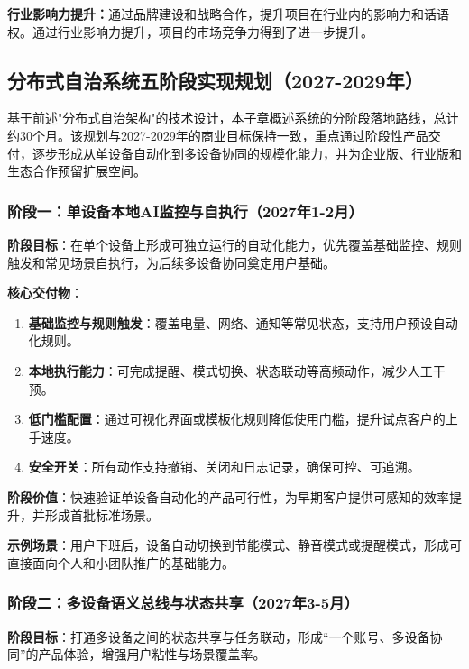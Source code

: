 \documentclass[12pt,a4paper]{article}
\begin{document}
\textbf{行业影响力提升：}通过品牌建设和战略合作，提升项目在行业内的影响力和话语权。通过行业影响力提升，项目的市场竞争力得到了进一步提升。

\subsection{分布式自治系统五阶段实现规划（2027-2029年）}

基于前述"分布式自治架构"的技术设计，本子章概述系统的分阶段落地路线，总计约30个月。该规划与2027-2029年的商业目标保持一致，重点通过阶段性产品交付，逐步形成从单设备自动化到多设备协同的规模化能力，并为企业版、行业版和生态合作预留扩展空间。

\subsubsection{阶段一：单设备本地AI监控与自执行（2027年1-2月）}

\textbf{阶段目标}：在单个设备上形成可独立运行的自动化能力，优先覆盖基础监控、规则触发和常见场景自执行，为后续多设备协同奠定用户基础。

\textbf{核心交付物}：

\begin{enumerate}
  \item \textbf{基础监控与规则触发}：覆盖电量、网络、通知等常见状态，支持用户预设自动化规则。
  \item \textbf{本地执行能力}：可完成提醒、模式切换、状态联动等高频动作，减少人工干预。
  \item \textbf{低门槛配置}：通过可视化界面或模板化规则降低使用门槛，提升试点客户的上手速度。
  \item \textbf{安全开关}：所有动作支持撤销、关闭和日志记录，确保可控、可追溯。
\end{enumerate}

\textbf{阶段价值}：快速验证单设备自动化的产品可行性，为早期客户提供可感知的效率提升，并形成首批标准场景。

\textbf{示例场景}：用户下班后，设备自动切换到节能模式、静音模式或提醒模式，形成可直接面向个人和小团队推广的基础能力。

\subsubsection{阶段二：多设备语义总线与状态共享（2027年3-5月）}

\textbf{阶段目标}：打通多设备之间的状态共享与任务联动，形成“一个账号、多设备协同”的产品体验，增强用户粘性与场景覆盖率。
\end{document}
